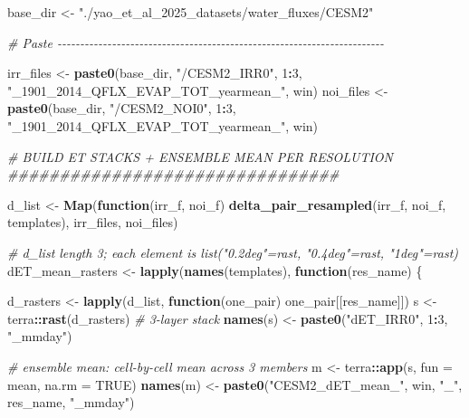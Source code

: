 \documentclass[
  11pt,
]{article}
\newenvironment{Shaded}{\begin{snugshade}}{\end{snugshade}}
\newcommand{\AttributeTok}[1]{\textcolor[rgb]{0.13,0.29,0.53}{#1}}
\newcommand{\CommentTok}[1]{\textcolor[rgb]{0.56,0.35,0.01}{\textit{#1}}}
\newcommand{\ConstantTok}[1]{\textcolor[rgb]{0.56,0.35,0.01}{#1}}
\newcommand{\ControlFlowTok}[1]{\textcolor[rgb]{0.13,0.29,0.53}{\textbf{#1}}}
\newcommand{\DecValTok}[1]{\textcolor[rgb]{0.00,0.00,0.81}{#1}}
\newcommand{\FunctionTok}[1]{\textcolor[rgb]{0.13,0.29,0.53}{\textbf{#1}}}
\newcommand{\NormalTok}[1]{#1}
\newcommand{\OtherTok}[1]{\textcolor[rgb]{0.56,0.35,0.01}{#1}}
\newcommand{\SpecialCharTok}[1]{\textcolor[rgb]{0.81,0.36,0.00}{\textbf{#1}}}
\newcommand{\StringTok}[1]{\textcolor[rgb]{0.31,0.60,0.02}{#1}}
\begin{document}
\begin{Shaded}
\begin{Highlighting}[]
\NormalTok{base\_dir }\OtherTok{\textless{}{-}} \StringTok{"./yao\_et\_al\_2025\_datasets/water\_fluxes/CESM2"}

\CommentTok{\# Paste {-}{-}{-}{-}{-}{-}{-}{-}{-}{-}{-}{-}{-}{-}{-}{-}{-}{-}{-}{-}{-}{-}{-}{-}{-}{-}{-}{-}{-}{-}{-}{-}{-}{-}{-}{-}{-}{-}{-}{-}{-}{-}{-}{-}{-}{-}{-}{-}{-}{-}{-}{-}{-}{-}{-}{-}{-}{-}{-}{-}{-}{-}{-}{-}{-}{-}{-}{-}{-}{-}{-}{-}}

\NormalTok{irr\_files }\OtherTok{\textless{}{-}} \FunctionTok{paste0}\NormalTok{(base\_dir, }\StringTok{"/CESM2\_IRR0"}\NormalTok{, }\DecValTok{1}\SpecialCharTok{:}\DecValTok{3}\NormalTok{, }\StringTok{"\_1901\_2014\_QFLX\_EVAP\_TOT\_yearmean\_"}\NormalTok{, win)}
\NormalTok{noi\_files }\OtherTok{\textless{}{-}} \FunctionTok{paste0}\NormalTok{(base\_dir, }\StringTok{"/CESM2\_NOI0"}\NormalTok{, }\DecValTok{1}\SpecialCharTok{:}\DecValTok{3}\NormalTok{, }\StringTok{"\_1901\_2014\_QFLX\_EVAP\_TOT\_yearmean\_"}\NormalTok{, win)}

\CommentTok{\# BUILD ET STACKS + ENSEMBLE MEAN PER RESOLUTION \#\#\#\#\#\#\#\#\#\#\#\#\#\#\#\#\#\#\#\#\#\#\#\#\#\#\#\#\#\#\#\#}

\NormalTok{d\_list }\OtherTok{\textless{}{-}} \FunctionTok{Map}\NormalTok{(}\ControlFlowTok{function}\NormalTok{(irr\_f, noi\_f) }\FunctionTok{delta\_pair\_resampled}\NormalTok{(irr\_f, noi\_f, templates),}
\NormalTok{              irr\_files, noi\_files)}

\CommentTok{\# d\_list length 3; each element is list("0.2deg"=rast, "0.4deg"=rast, "1deg"=rast)}
\NormalTok{dET\_mean\_rasters }\OtherTok{\textless{}{-}} \FunctionTok{lapply}\NormalTok{(}\FunctionTok{names}\NormalTok{(templates), }\ControlFlowTok{function}\NormalTok{(res\_name) \{}

\NormalTok{  d\_rasters }\OtherTok{\textless{}{-}} \FunctionTok{lapply}\NormalTok{(d\_list, }\ControlFlowTok{function}\NormalTok{(one\_pair) one\_pair[[res\_name]])}
\NormalTok{  s }\OtherTok{\textless{}{-}}\NormalTok{ terra}\SpecialCharTok{::}\FunctionTok{rast}\NormalTok{(d\_rasters) }\CommentTok{\# 3{-}layer stack}
  \FunctionTok{names}\NormalTok{(s) }\OtherTok{\textless{}{-}} \FunctionTok{paste0}\NormalTok{(}\StringTok{"dET\_IRR0"}\NormalTok{, }\DecValTok{1}\SpecialCharTok{:}\DecValTok{3}\NormalTok{, }\StringTok{"\_mmday"}\NormalTok{)}

  \CommentTok{\# ensemble mean: cell{-}by{-}cell mean across 3 members}
\NormalTok{  m }\OtherTok{\textless{}{-}}\NormalTok{ terra}\SpecialCharTok{::}\FunctionTok{app}\NormalTok{(s, }\AttributeTok{fun =}\NormalTok{ mean, }\AttributeTok{na.rm =} \ConstantTok{TRUE}\NormalTok{)}
  \FunctionTok{names}\NormalTok{(m) }\OtherTok{\textless{}{-}} \FunctionTok{paste0}\NormalTok{(}\StringTok{"CESM2\_dET\_mean\_"}\NormalTok{, win, }\StringTok{"\_"}\NormalTok{, res\_name, }\StringTok{"\_mmday"}\NormalTok{)}


\end{Highlighting}
\end{Shaded}
\end{document}
